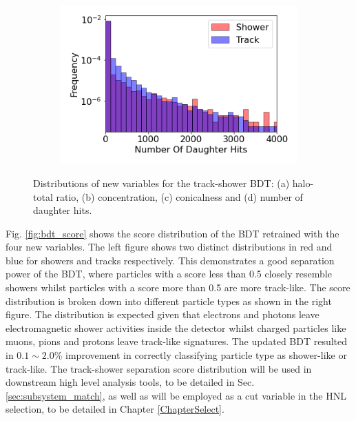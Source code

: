 \begin{figure}[b!]
\begin{subfigure}[b]{0.45\textwidth}
            \caption{}%
        \end{subfigure}
        \hfill
        \begin{subfigure}[b]{0.45\textwidth}  
            \centering 
            \includegraphics[width=\textwidth]{Feature_Number_Of_Daughter_Hits}
            \caption{}%
        \end{subfigure}
        \caption[New Variable Distributions of Track-Shower Separation BDT]{
	Distributions of new variables for the track-shower BDT: (a) halo-total ratio, (b) concentration, (c) conicalness and (d) number of daughter hits.
	}
        \label{fig:bdt_features}
\end{figure}

Fig. \ref{fig:bdt_score} shows the score distribution of the BDT retrained with the four new variables.
The left figure shows two distinct distributions in red and blue for showers and tracks respectively.
This demonstrates a good separation power of the BDT, where particles with a score less than 0.5 closely resemble showers whilst particles with a score more than 0.5 are more track-like.
The score distribution is broken down into different particle types as shown in the right figure.
The distribution is expected given that electrons and photons leave electromagnetic shower activities inside the detector whilst charged particles like muons, pions and protons leave track-like signatures. 
The updated BDT resulted in $0.1\sim2.0\%$ improvement in correctly classifying particle type as shower-like or track-like.
The track-shower separation score distribution will be used in downstream high level analysis tools, to be detailed in Sec. \ref{sec:subsystem_match}, as well as will be employed as a cut variable in the HNL selection, to be detailed in Chapter \ref{ChapterSelect}.

